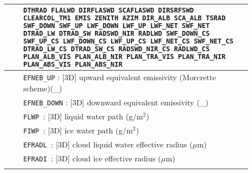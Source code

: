 \begin{center}
\begin{makeimage}
\begin{tabular}{|>{\centering}p{3cm}|>{\centering}p{2.5cm}|p{11cm}|}
\hline
\multirow{36}{*}{NRAD\_3D}\index{NRAD\_3D!\innam{NAM\_DIAG}}&\multirow{20}{*}{4} &{\tt DTHRAD FLALWD DIRFLASWD SCAFLASWD DIRSRFSWD CLEARCOL\_TM1 EMIS ZENITH AZIM DIR\_ALB SCA\_ALB TSRAD SWF\_DOWN SWF\_UP LWF\_DOWN LWF\_UP LWF\_NET SWF\_NET DTRAD\_LW DTRAD\_SW RADSWD\_NIR RADLWD SWF\_DOWN\_CS SWF\_UP\_CS LWF\_DOWN\_CS LWF\_UP\_CS LWF\_NET\_CS SWF\_NET\_CS DTRAD\_LW\_CS DTRAD\_SW\_CS RADSWD\_NIR\_CS RADLWD\_CS  PLAN\_ALB\_VIS  PLAN\_ALB\_NIR PLAN\_TRA\_VIS PLAN\_TRA\_NIR PLAN\_ABS\_VIS PLAN\_ABS\_NIR}  \\\cline{3-3}
& & {\tt EFNEB\_UP} : [3D] upward equivalent emissivity (Morcrette scheme)(\_) \\\cline{3-3}

& & {\tt EFNEB\_DOWN} : [3D] downward equivalent emissivity (\_) \\\cline{3-3}
& &{\tt FLWP }: [3D] liquid water path (g/m$^2$) \\\cline{3-3}
& &{\tt FIWP }: [3D] ice water path (g/m$^2$) \\\cline{3-3}
& &{\tt EFRADL }: [3D] cloud liquid water effective radius ($\mu$m) \\\cline{3-3}
& &{\tt EFRADI }: [3D] cloud ice effective radius ($\mu$m) \\\cline{3-3}


\end{tabular}
\end{makeimage}
\end{center}
